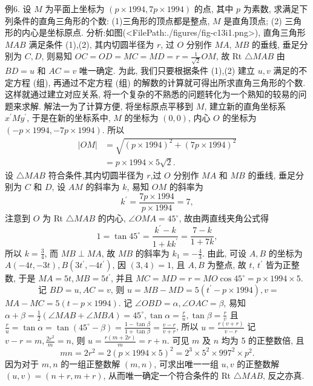 例6. 设 $M$ 为平面上坐标为 $(p \times 1994,7 p \times 1994)$ 的点, 其中 $p$ 为素数, 求满足下列条件的直角三角形的个数:
(1)三角形的顶点都是整点, $M$ 是直角顶点;
(2) 三角形的内心是坐标原点.
分析:如图(<FilePath:./figures/fig-c13i1.png>), 直角三角形 $M A B$ 满足条件 (1),(2), 其内切圆半径为 $r$, 过 $O$ 分别作 $M A$, $M B$ 的垂线, 垂足分别为 $C, D$, 则易知 $O C= O D=M C=M D=r=\frac{1}{\sqrt{2}} O M$, 故 Rt $\triangle M A B$ 由 $B D=u$ 和 $A C=v$ 唯一确定.
为此, 我们只要根据条件 (1),(2) 建立 $u, v$ 满足的不定方程 (组), 再通过不定方程 (组) 的解数的计算就可得出所求直角三角形的个数.
这样就通过建立对应关系, 将一个复杂的不熟悉的问题转化为一个熟知的较易的问题来求解.
解法一为了计算方便, 将坐标原点平移到 $M$, 建立新的直角坐标系 $x^{\prime} M y^{\prime}$, 于是在新的坐标系中, $M$ 的坐标为 $(0,0)$, 内心 $O$ 的坐标为 $(-p \times 1994,-7 p \times 1994)$. 所以
$$
\begin{aligned}
|O M| & =\sqrt{(p \times 1994)^2+(7 p \times 1994)^2} \\
& =p \times 1994 \times 5 \sqrt{2} .
\end{aligned}
$$
设 $\triangle M A B$ 符合条件,其内切圆半径为 $r$,过 $O$ 分别作 $M A$ 和 $M B$ 的垂线, 垂足分别为 $C$ 和 $D$, 设 $A M$ 的斜率为 $k$, 易知 $O M$ 的斜率为
$$
k^{\prime}=\frac{7 p \times 1994}{p \times 1994}=7,
$$
注意到 $O$ 为 Rt $\triangle M A B$ 的内心, $\angle O M A=45^{\circ}$, 故由两直线夹角公式得
$$
1=\tan 45^{\circ}=\frac{k^{\prime}-k}{1+k k^{\prime}}=\frac{7-k}{1+7 k},
$$
所以 $k=\frac{3}{4}$, 而 $M B \perp M A$, 故 $M B$ 的斜率为 $k_1=-\frac{4}{3}$. 由此, 可设 $A, B$ 的坐标为 $A(-4 t,-3 t), B\left(3 t^{\prime},-4 t^{\prime}\right)$, 因 $(3,4)=1$, 且 $A, B$ 为整点, 故 $t$, $t^{\prime}$ 皆为正整数, 于是 $M A=5 t, M B=5 t^{\prime}$, 并且 $M C=M D=r=M O \cos 45^{\circ}= p \times 1994 \times 5$.
$$
\text { 记 } B D=u, A C=v \text {, 则 } u=M B-M D=5\left(t^{\prime}-p \times 1994\right), v=
$$
$M A-M C=5(t-p \times 1994)$. 记 $\angle O B D=\alpha, \angle O A C=\beta$, 易知 $\alpha+\beta= \frac{1}{2}(\angle M A B+\angle M B A)=45^{\circ}, \tan \alpha=\frac{r}{u}, \tan \beta=\frac{r}{v}$ 且 $\frac{r}{u}=\tan \alpha= \tan \left(45^{\circ}-\beta\right)=\frac{1-\tan \beta}{1+\tan \beta}=\frac{v-r}{v+r}$, 所以 $u=\frac{r(v+r)}{v-r}$ 记 $v-r=m, \frac{2 r^2}{m}=n$, 则 $u=\frac{r(m+2 r)}{m}=r+n$. 可见 $m$ 及 $n$ 均为 5 的正整数倍, 且
$$
m n=2 r^2=2(p \times 1994 \times 5)^2=2^3 \times 5^2 \times 997^2 \times p^2 .
$$
因为对于 $m, n$ 的一组正整数解 $(m, n)$, 可求出唯一一组 $u, v$ 的正整数解 $(u, v)=(n+r, m+r)$, 从而唯一确定一个符合条件的 Rt $\triangle M A B$, 反之亦真.
